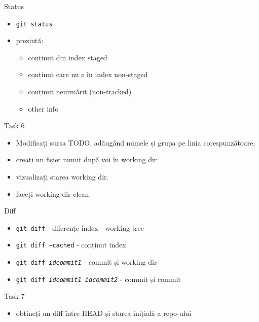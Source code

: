 \documentclass{beamer}
\begin{document}
\begin{frame}{Status}
  \begin{itemize}
    \item \texttt{git status}
    \item prezintă:
      \begin{itemize}
        \item conținut din index {staged}
        \item conținut care nu e în index {non-staged}
        \item conținut neurmărit (non-tracked)
        \item other info
      \end{itemize}
  \end{itemize}
  \pause
  \begin{alertblock}{Task 6}
    \begin{itemize}
      \item Modificați sursa TODO, adăugând numele și grupa pe linia
      corespunzătoare.
      \item creați un fișier numit după voi în working dir
      \item vizualizați starea working dir.
      \item faceți working dir clean
    \end{itemize}
  \end{alertblock}
\end{frame}

\begin{frame}{Diff}
  \begin{itemize}
    \item \texttt{git diff} - diferențe index - working tree
    \item \texttt{git diff --cached} - conținut index
    \item \texttt{git diff \textit{idcommit1}} - commit și working dir
    \item \texttt{git diff \textit{idcommit1} \textit{idcommit2}} - commit și
    commit
  \end{itemize}
  \pause
  \begin{alertblock}{Task 7}
    \begin{itemize}
      \item obtineți un diff între HEAD și starea inițială a repo-ului
    \end{itemize}
  \end{alertblock}
\end{frame}
\end{document}
